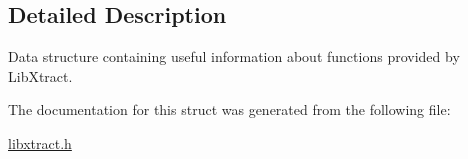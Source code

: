 \begin{DoxyCompactItemize}
\end{tabbing}\end{DoxyCompactItemize}


\subsection{Detailed Description}
Data structure containing useful information about functions provided by Lib\-Xtract. 

The documentation for this struct was generated from the following file\-:\begin{DoxyCompactItemize}
\item 
\hyperlink{libxtract_8h}{libxtract.\-h}\end{DoxyCompactItemize}
